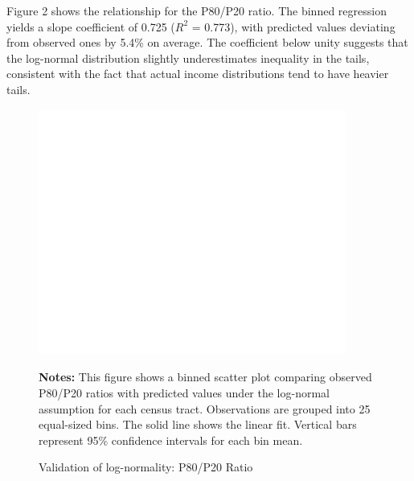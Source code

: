 Figure 2 shows the relationship for the P80/P20 ratio. The binned regression yields a slope coefficient of 0.725 ($R^2$ = 0.773), with predicted values deviating from observed ones by 5.4\% on average. The coefficient below unity suggests that the log-normal distribution slightly underestimates inequality in the tails, consistent with the fact that actual income distributions tend to have heavier tails.


\begin{figure}[H]
\begin{center}
\captionsetup{justification=centering}
\caption{Validation of log-normality: P80/P20 Ratio}
\label{fig:p80p20}
\includegraphics[width=0.9\textwidth]{output/binned_scatter_p80p20.png}
\end{center}
\begin{fignotes}
\textbf{Notes:} This figure shows a binned scatter plot comparing observed P80/P20 ratios with predicted values under the log-normal assumption for each census tract. Observations are grouped into 25 equal-sized bins. The solid line shows the linear fit. Vertical bars represent 95\% confidence intervals for each bin mean.
\end{fignotes}
\end{figure}